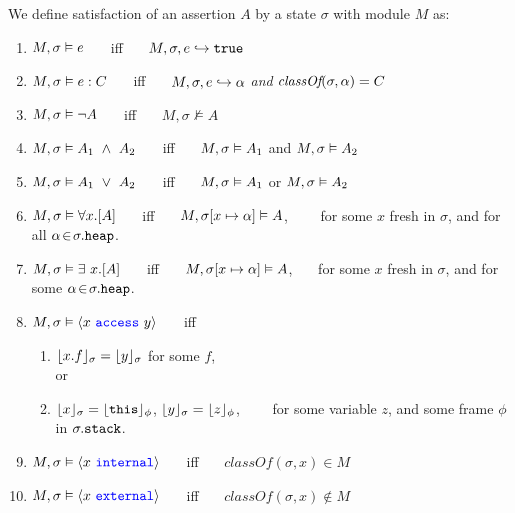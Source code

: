 \begin{definition} 
\label{def:chainmail-semantics}
We define satisfaction of an assertion $A$ by a %
state $\sigma$ with 
 module $M$ as:
\begin{enumerate}
\item
\label{cExpr}
$M , \sigma \vDash e$ \ \ \ iff \ \ \  $M, \sigma, e \hookrightarrow \texttt{true}$
\item
\label{cClass}
$M , \sigma \vDash e : C$ \ \ \ iff \ \ \  $M, \sigma, e \hookrightarrow \alpha$ \textit{and} $\textit{classOf}(\sigma, \alpha) = C$
\item
$M , \sigma \vDash \neg A$ \ \ \ iff \ \ \  ${M},{\sigma}\nvDash{A}$
\item
$\satisfiesA{M}{\sigma}{A_1\ \wedge\ A_2}$ \ \ \ iff \ \ \  $M , \sigma \vDash A_1$ and 
$M , \sigma \vDash A_2$
\item
$\satisfiesA{M}{\sigma}{A_1\ \vee\ A_2}$ \ \ \ iff \ \ \  $M , \sigma \vDash A_1$ or 
$M , \sigma \vDash A_2$
\item
$M , \sigma \vDash \forall x.[A]$ \ \ \ iff \ \ \  
$M , \sigma[x \mapsto \alpha] \vDash A$, \ 
\ \ \ for some $x$ fresh in $\sigma$, and for all $\alpha\!\in\!\sigma.{\texttt{heap}}$.
\item
$M , \sigma \vDash \exists\ x.[A]$ \ \ \ iff \ \ \  
$M , \sigma[x \mapsto \alpha] \vDash A$, \ 
\ \ for some $x$ fresh in $\sigma$, and for some $ \alpha\!\in\!\sigma.{\texttt{heap}}$. 
\item
\label{cAccess}
$M , \sigma \vDash \langle x\ {\color{blue}\texttt{access}}\ y \rangle$ \ \ \ iff \ \ \  
\begin{enumerate}
\item
\label{c1}
$\lfloor x.f \rfloor_{\sigma}={\lfloor y \rfloor_{\sigma}}$ for some $f$, \\
  or
\item
\label{c2}
{$\lfloor x \rfloor_{\sigma}=\lfloor {\texttt{this}} \rfloor_{\phi}$}, {$\lfloor y \rfloor_{\sigma}=\lfloor z \rfloor_{\phi}$}, \ \ \ \
for some variable $z$, and some frame $\phi$ in $\sigma.
{\texttt{stack}}$.
\end{enumerate}
\item
\label{cInternal}
$M , \sigma \vDash \langle x\ {\color{blue}\texttt{internal}}\rangle$ \ \ \ iff \ \ \  
$\textit{classOf}(\sigma,x) \in M$
\item
\label{cExternal}
$M , \sigma \vDash \langle x\ {\color{blue}\texttt{external}}\rangle$ \ \ \ iff \ \ \  
$\textit{classOf}(\sigma,x) \not\in M$

\end{enumerate}
\end{definition}
